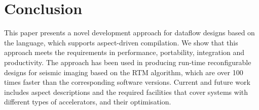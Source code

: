 \section{Conclusion}

This paper presents a novel development approach for dataflow designs
based on the \MAXC{} language, which supports aspect-driven
compilation. We show that this approach meets the requirements in
performance, portability, integration and productivity. The approach
has been used in producing run-time reconfigurable designs for seismic
imaging based on the RTM algorithm, which are over 100 times faster
than the corresponding software versions. Current and future work
includes aspect descriptions and the required facilities that cover
systems with different types of accelerators, and their optimisation.
